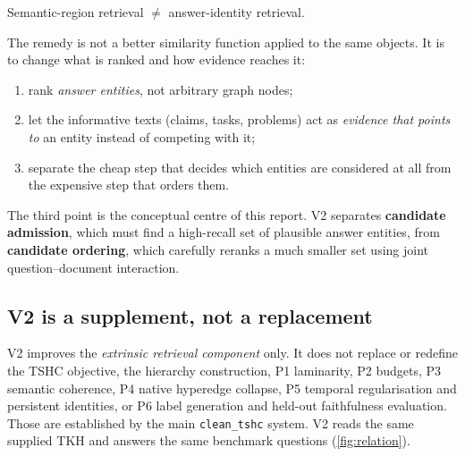 \documentclass[11pt,a4paper]{article}
\newcommand{\cref}[1]{\autoref{#1}}
\theoremstyle{remark}
\newcommand{\code}[1]{\texttt{\small #1}}
\begin{document}
\begin{keybox}
\centering
Semantic-region retrieval $\neq$ answer-identity retrieval.
\end{keybox}

The remedy is not a better similarity function applied to the same objects. It is to
change what is ranked and how evidence reaches it:

\begin{enumerate}
  \item rank \emph{answer entities}, not arbitrary graph nodes;
  \item let the informative texts (claims, tasks, problems) act as \emph{evidence that
        points to} an entity instead of competing with it;
  \item separate the cheap step that decides which entities are considered at all from
        the expensive step that orders them.
\end{enumerate}

The third point is the conceptual centre of this report. V2 separates
\textbf{candidate admission}, which must find a high-recall set of plausible answer
entities, from \textbf{candidate ordering}, which carefully reranks a much smaller set
using joint question--document interaction.

\subsection{V2 is a supplement, not a replacement}

V2 improves the \emph{extrinsic retrieval component} only. It does not replace or
redefine the TSHC objective, the hierarchy construction, P1 laminarity, P2 budgets, P3
semantic coherence, P4 native hyperedge collapse, P5 temporal regularisation and
persistent identities, or P6 label generation and held-out faithfulness evaluation. Those
are established by the main \code{clean\_tshc} system. V2 reads the same supplied TKH and
answers the same benchmark questions (\cref{fig:relation}).
\end{document}
